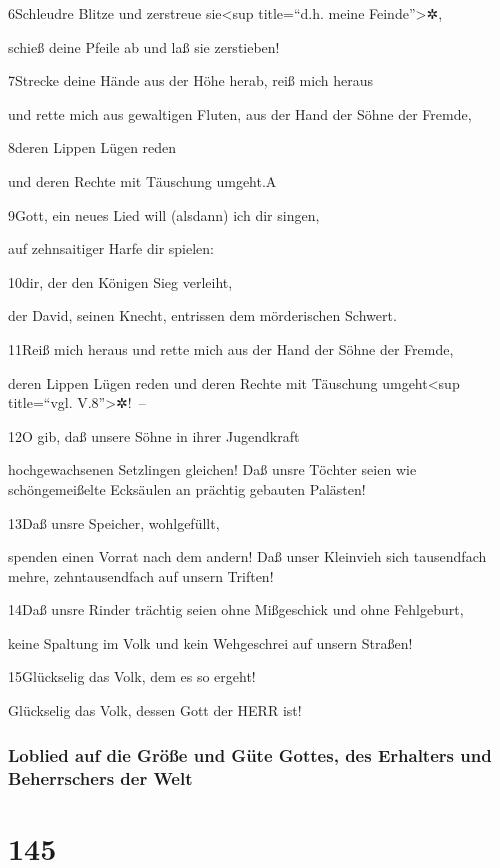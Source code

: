 6Schleudre Blitze und zerstreue sie\textless sup title=``d.h. meine
Feinde''\textgreater✲,

schieß deine Pfeile ab und laß sie zerstieben!

7Strecke deine Hände aus der Höhe herab, reiß mich heraus

und rette mich aus gewaltigen Fluten, aus der Hand der Söhne der Fremde,

8deren Lippen Lügen reden

und deren Rechte mit Täuschung umgeht.{A}

9Gott, ein neues Lied will (alsdann) ich dir singen,

auf zehnsaitiger Harfe dir spielen:

10dir, der den Königen Sieg verleiht,

der David, seinen Knecht, entrissen dem mörderischen Schwert.

11Reiß mich heraus und rette mich aus der Hand der Söhne der Fremde,

deren Lippen Lügen reden und deren Rechte mit Täuschung
umgeht\textless sup title=``vgl. V.8''\textgreater✲!~--

12O gib, daß unsere Söhne in ihrer Jugendkraft

hochgewachsenen Setzlingen gleichen! Daß unsre Töchter seien wie
schöngemeißelte Ecksäulen an prächtig gebauten Palästen!

13Daß unsre Speicher, wohlgefüllt,

spenden einen Vorrat nach dem andern! Daß unser Kleinvieh sich
tausendfach mehre, zehntausendfach auf unsern Triften!

14Daß unsre Rinder trächtig seien ohne Mißgeschick und ohne Fehlgeburt,

keine Spaltung im Volk und kein Wehgeschrei auf unsern Straßen!

15Glückselig das Volk, dem es so ergeht!

Glückselig das Volk, dessen Gott der HERR ist!

\hypertarget{loblied-auf-die-gruxf6uxdfe-und-guxfcte-gottes-des-erhalters-und-beherrschers-der-welt}{%
\subsubsection{Loblied auf die Größe und Güte Gottes, des Erhalters und
Beherrschers der
Welt}\label{loblied-auf-die-gruxf6uxdfe-und-guxfcte-gottes-des-erhalters-und-beherrschers-der-welt}}

\hypertarget{section-144}{%
\section{145}\label{section-144}}


